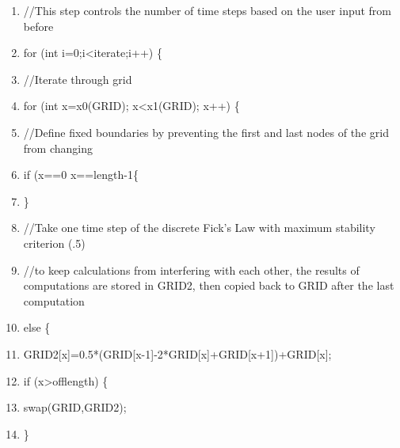 \documentclass[10pt]{article}
\begin{document}
\begin{shadebox}
\begin{enumerate} \itemsep1pt \parskip0pt 
\setcounter{enumi}{37}
\item //This step controls the number of time steps based on the user input from before
\item for (int i=0;i\textless iterate;i++) \{
\item //Iterate through grid
\item \hspace{10pt}        for (int x=x0(GRID); x\textless x1(GRID); x++) \{
\item //Define fixed boundaries by preventing the first and last nodes of the grid from changing
\item \hspace{10pt} \hspace{10pt}                if (x==0 \textbar \textbar x==length-1\{
\item \hspace{10pt} \hspace{10pt}                 \}
\item //Take one time step of the discrete Fick's Law with maximum stability criterion (.5)
\item //to keep calculations from interfering with each other, the results of computations are stored in GRID2, then copied back to GRID after the last computation
\item \hspace{10pt} \hspace{10pt}                 else \{
\item \hspace{10pt} \hspace{10pt} \hspace{10pt}                         GRID2[x]=0.5*(GRID[x-1]-2*GRID[x]+GRID[x+1])+GRID[x];
\item \hspace{10pt} \hspace{10pt} \hspace{10pt}                         if (x\textgreater offlength) \{
\item \hspace{10pt} \hspace{10pt} \hspace{10pt} \hspace{10pt}                                 swap(GRID,GRID2);
\item \hspace{10pt} \hspace{10pt} \hspace{10pt}                         \}

\end{enumerate}
\end{shadebox}
\end{document}
